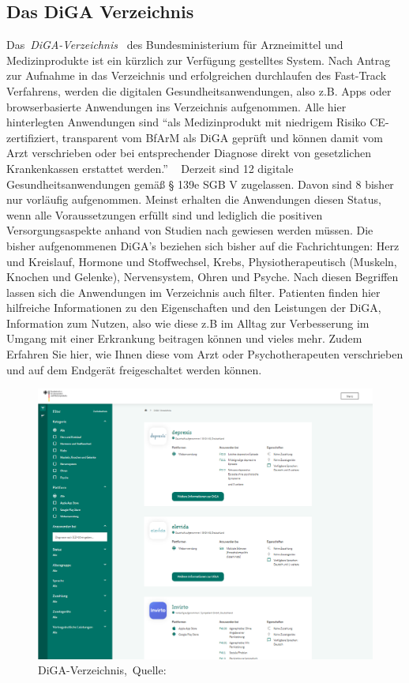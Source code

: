 \subsection{Das DiGA Verzeichnis}
Das~\textit{DiGA-Verzeichnis}~\cite{digaverzeichnis} des Bundesministerium für Arzneimittel und Medizinprodukte ist ein kürzlich zur Verfügung gestelltes System. Nach Antrag zur Aufnahme in das Verzeichnis und erfolgreichen durchlaufen des Fast-Track Verfahrens, werden die digitalen Gesundheitsanwendungen, also z.B. Apps oder browserbasierte Anwendungen ins Verzeichnis aufgenommen. Alle hier hinterlegten Anwendungen sind ``als Medizinprodukt mit niedrigem Risiko CE-zertifiziert, transparent vom BfArM als DiGA geprüft und können damit vom Arzt verschrieben oder bei entsprechender Diagnose direkt von gesetzlichen Krankenkassen erstattet werden.'' ~\cite{digaNutzer}
Derzeit sind 12 digitale Gesundheitsanwendungen gemäß § 139e SGB V zugelassen.
Davon sind 8 bisher nur vorläufig aufgenommen. Meinst erhalten die Anwendungen diesen Status, wenn alle Voraussetzungen erfüllt sind und lediglich die positiven Versorgungsaspekte anhand von Studien nach gewiesen werden müssen. Die bisher aufgenommenen DiGA's beziehen sich bisher auf die Fachrichtungen: Herz und Kreislauf, Hormone und Stoffwechsel, Krebs, Physiotherapeutisch (Muskeln, Knochen und Gelenke), Nervensystem, Ohren und Psyche. Nach diesen Begriffen lassen sich die Anwendungen im Verzeichnis auch filter.
Patienten finden hier hilfreiche Informationen zu den Eigenschaften und den Leistungen der DiGA, Information zum Nutzen, also wie diese z.B im Alltag zur Verbesserung im Umgang mit einer Erkrankung beitragen können und vieles mehr. Zudem Erfahren Sie hier, wie Ihnen diese vom Arzt oder Psychotherapeuten verschrieben und auf dem Endgerät freigeschaltet werden können.
\begin{figure}[H]
	\centering
	\includegraphics[width=450px, keepaspectratio]{assets/digaVerzeichnis.png}
	\caption[DiGA-Verzeichnis]{DiGA-Verzeichnis,~Quelle:~\cite{digaverzeichnis}}
	\label{fig:digaverzeichnis}
\end{figure}
